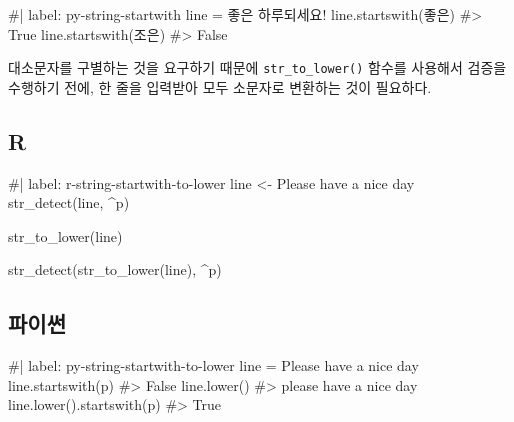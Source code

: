 \documentclass[
  letterpaper,
]{book}
\newenvironment{Shaded}{\begin{snugshade}}{\end{snugshade}}
\newcommand{\NormalTok}[1]{\textcolor[rgb]{0.00,0.23,0.31}{#1}}
\begin{document}
\begin{Shaded}
\begin{Highlighting}[]
\NormalTok{\#| label: py{-}string{-}startwith}
\NormalTok{line = \textquotesingle{}좋은 하루되세요!\textquotesingle{}}
\NormalTok{line.startswith(\textquotesingle{}좋은\textquotesingle{})}
\NormalTok{\#\textgreater{} True}
\NormalTok{line.startswith(\textquotesingle{}조은\textquotesingle{})}
\NormalTok{\#\textgreater{} False}
\end{Highlighting}
\end{Shaded}

대소문자를 구별하는 것을 요구하기 때문에 \texttt{str\_to\_lower()}
함수를 사용해서 검증을 수행하기 전에, 한 줄을 입력받아 모두 소문자로
변환하는 것이 필요하다.

\subsection{R}

\begin{Shaded}
\begin{Highlighting}[]
\NormalTok{\#| label: r{-}string{-}startwith{-}to{-}lower}
\NormalTok{line \textless{}{-} \textquotesingle{}Please have a nice day\textquotesingle{}}
\NormalTok{str\_detect(line, \textquotesingle{}\^{}p\textquotesingle{})}

\NormalTok{str\_to\_lower(line)}

\NormalTok{str\_detect(str\_to\_lower(line), \textquotesingle{}\^{}p\textquotesingle{})}
\end{Highlighting}
\end{Shaded}

\subsection{파이썬}

\begin{Shaded}
\begin{Highlighting}[]
\NormalTok{\#| label: py{-}string{-}startwith{-}to{-}lower}
\NormalTok{line = \textquotesingle{}Please have a nice day\textquotesingle{}}
\NormalTok{line.startswith(\textquotesingle{}p\textquotesingle{})}
\NormalTok{\#\textgreater{} False}
\NormalTok{line.lower()}
\NormalTok{\#\textgreater{} \textquotesingle{}please have a nice day\textquotesingle{}}
\NormalTok{line.lower().startswith(\textquotesingle{}p\textquotesingle{})}
\NormalTok{\#\textgreater{} True}
\end{Highlighting}
\end{Shaded}
\end{document}
